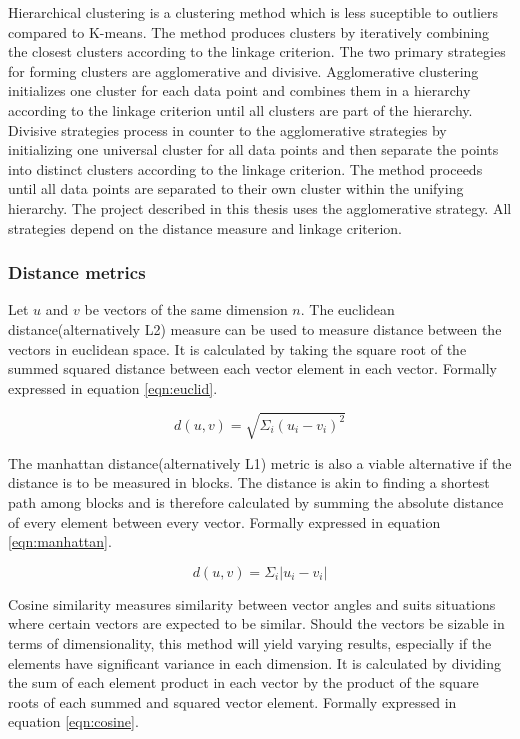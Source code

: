 Hierarchical clustering is a clustering method which is less suceptible to outliers compared to K-means. The method produces clusters by iteratively combining the closest clusters according to the linkage criterion. The two primary strategies for forming clusters are agglomerative and divisive. Agglomerative clustering initializes one cluster for each data point and combines them in a hierarchy according to the linkage criterion until all clusters are part of the hierarchy. Divisive strategies process in counter to the agglomerative strategies by initializing one universal cluster for all data points and then separate the points into distinct clusters according to the linkage criterion. The method proceeds until all data points are separated to their own cluster within the unifying hierarchy. The project described in this thesis uses the agglomerative strategy. All strategies depend on the distance measure and linkage criterion.

\subsubsection{Distance metrics}
Let $u$ and $v$ be vectors of the same dimension $n$. The euclidean distance(alternatively L2) measure can be used to measure distance between the vectors in euclidean space. It is calculated by taking the square root of the summed squared distance between each vector element in each vector. Formally expressed in equation \ref{eqn:euclid}.

\begin{equation}
\label{eqn:euclid}
d(u, v) = \sqrt{\Sigma_i (u_i - v_i)^2} 
\end{equation}

The manhattan distance(alternatively L1) metric is also a viable alternative if the distance is to be measured in blocks. The distance is akin to finding a shortest path among blocks and is therefore calculated by summing the absolute distance of every element between every vector. Formally expressed in equation \ref{eqn:manhattan}.

\begin{equation}
\label{eqn:manhattan}
d(u, v) = \Sigma_i |u_i - v_i|
\end{equation}

Cosine similarity measures similarity between vector angles and suits situations where certain vectors are expected to be similar. Should the vectors be sizable in terms of dimensionality, this method will yield varying results, especially if the elements have significant variance in each dimension. It is calculated by dividing the sum of each element product in each vector by the product of the square roots of each summed and squared vector element. Formally expressed in equation \ref{eqn:cosine}.

